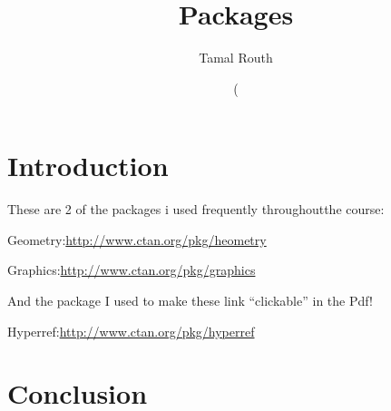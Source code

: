 \documentclass{article}
\title{Packages}
\author{Tamal Routh}
\date()
\begin{document}
\maketitle

\section{Introduction}

These are 2 of the packages i used frequently throughoutthe course:

Geometry:\url{http://www.ctan.org/pkg/heometry}

Graphics:\url{http://www.ctan.org/pkg/graphics}

\noindent And the package I used to make these link ``clickable'' in the Pdf!

Hyperref:\url{http://www.ctan.org/pkg/hyperref}

\section{Conclusion}
\end{document}
